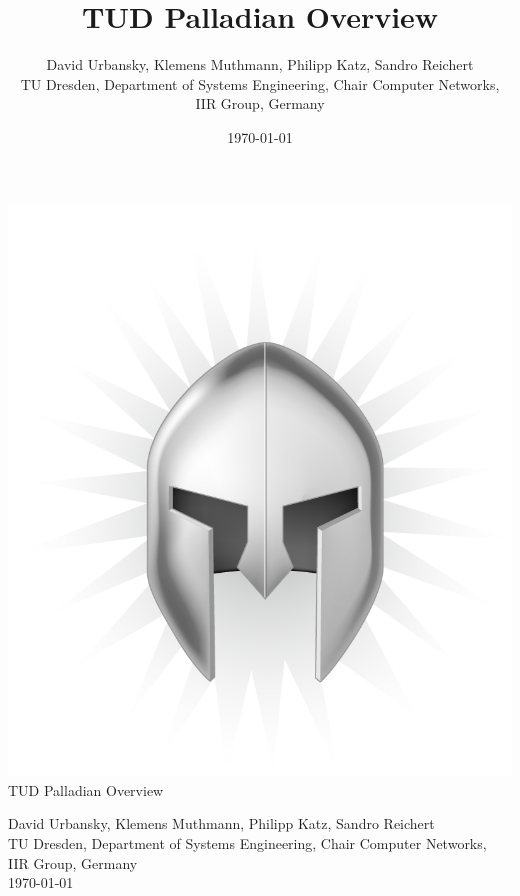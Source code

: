 \documentclass[a4paper,twoside]{book}      %
\date{\today}
\title{TUD Palladian Overview}
\author{David Urbansky, Klemens Muthmann, Philipp Katz, Sandro Reichert \\
{\small TU Dresden, Department of Systems Engineering, Chair Computer Networks, IIR Group, Germany}
}
\newcommand{\bigsize}{\fontsize{18pt}{10pt}\selectfont}
\newcommand{\titleelementsize}{\fontsize{12pt}{10pt}\selectfont}
\begin{document}

\begin{titlepage}
\centering

\includegraphics[scale=0.4]{img/Palladian_Logo_DRAFT.png} \\
{\bigsize TUD Palladian Overview} \\

\vspace{1.5cm}

{\titleelementsize David Urbansky, Klemens Muthmann, Philipp Katz, Sandro Reichert} \\
\vspace{0.1cm}
{\small TU Dresden, Department of Systems Engineering, Chair Computer Networks, IIR Group, Germany} \\
\vspace{0.8cm}
{\titleelementsize \today} \\
\vspace{2cm}
\end{titlepage}



\tableofcontents

\normalsize
{}






\end{document}
